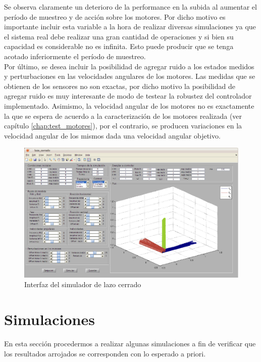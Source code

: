 \documentclass[main]{subfiles}
\begin{document}
Se observa claramente un deterioro de la performance en la subida al aumentar el per\'iodo de muestreo y de acci\'on sobre los motores. Por dicho motivo es importante incluir esta variable a la hora de realizar diversas simulaciones ya que el sistema real debe realizar una gran cantidad de operaciones y si bien su capacidad es considerable no es infinita. Esto puede producir que se tenga acotado inferiormente el per\'iodo de muestreo.\\

Por \'ultimo, se desea incluir la posibilidad de agregar ruido a los estados medidos y perturbaciones en las velocidades angulares de los motores. Las medidas que se obtienen de los sensores no son exactas, por dicho motivo la posibilidad de agregar ruido es muy interesante de modo de testear la robustez del controlador implementado. Asimismo, la velocidad angular de los motores no es exactamente la que se espera de acuerdo a la caracterizaci\'on de los motores realizada (ver cap\'itulo \ref{chap:test_motores}), por el contrario, se producen variaciones en la velocidad angular de los mismos dada una velocidad angular objetivo.
  \begin{figure}[h!]
	\centering
	\includegraphics[width=1\textwidth]{./pics_simulador/vistac.pdf}
	\caption{Interfaz del simulador de lazo cerrado}
	\label{fig:vistac}
\end{figure}

\section{Simulaciones}
En esta secci\'on procedermos a realizar algunas simulaciones a fin de verificar que los resultados arrojados se corresponden con lo esperado a priori. 
\end{document}
